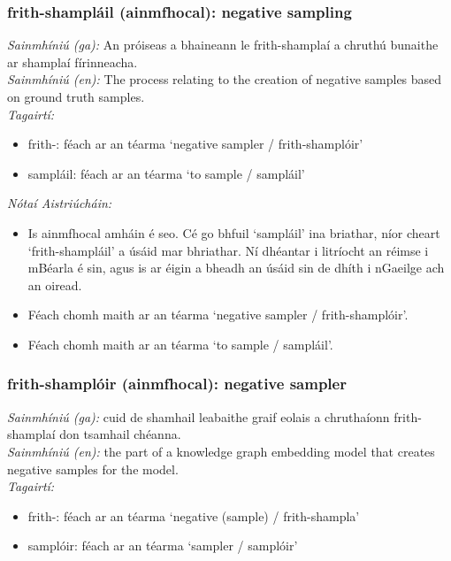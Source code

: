 \subsubsection*{frith-shampláil (ainmfhocal): negative sampling}
 \noindent \textit{Sainmhíniú (ga):} An próiseas a bhaineann le frith-shamplaí a chruthú bunaithe ar shamplaí fírinneacha.
\\
 \noindent \textit{Sainmhíniú (en):} The process relating to the creation of negative samples based on ground truth samples.
\\
 \noindent \textit{Tagairtí:}
\begin{itemize}
	\item frith-: féach ar an téarma `negative sampler / frith-shamplóir'
	\item sampláil: féach ar an téarma `to sample / sampláil'
\end{itemize}

 \noindent \textit{Nótaí Aistriúcháin:}
\begin{itemize}
	\item Is ainmfhocal amháin é seo. Cé go bhfuil `sampláil' ina briathar, níor cheart `frith-shampláil' a úsáid mar bhriathar. Ní dhéantar i litríocht an réimse i mBéarla é sin, agus is ar éigin a bheadh an úsáid sin de dhíth i nGaeilge ach an oiread.
	\item Féach chomh maith ar an téarma `negative sampler / frith-shamplóir'.
	\item Féach chomh maith ar an téarma `to sample / sampláil'.
\end{itemize}


\subsubsection*{frith-shamplóir (ainmfhocal): negative sampler}
 \noindent \textit{Sainmhíniú (ga):} cuid de shamhail leabaithe graif eolais a chruthaíonn frith-shamplaí don tsamhail chéanna.
\\
 \noindent \textit{Sainmhíniú (en):} the part of a knowledge graph embedding model that creates negative samples for the model.
\\
 \noindent \textit{Tagairtí:}
\begin{itemize}
	\item frith-: féach ar an téarma `negative (sample) / frith-shampla'
	\item samplóir: féach ar an téarma `sampler / samplóir'
\end{itemize}

